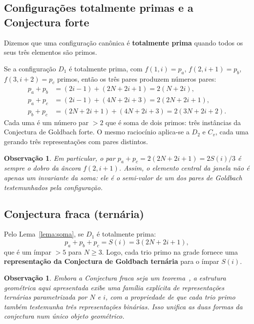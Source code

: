 \documentclass[12pt, a4paper]{article}
\newtheorem{observacao}[lema]{Observação}
\begin{document}
	\subsection{Configurações totalmente primas e a Conjectura forte}
	
	Dizemos que uma configuração canônica é \textbf{totalmente prima} quando todos os
	seus três elementos são primos.
	
	Se a configuração $D_1$ é totalmente prima, com
	$f(1,i)=p_a$, $f(2,i+1)=p_b$, $f(3,i+2)=p_c$ primos, então os três pares produzem
	números pares:
	\begin{align*}
		p_a + p_b &= (2i-1)+(2N+2i+1) = 2(N+2i),\\
		p_a + p_c &= (2i-1)+(4N+2i+3) = 2(2N+2i+1),\\
		p_b + p_c &= (2N+2i+1)+(4N+2i+3) = 2(3N+2i+2).
	\end{align*}
	Cada uma é um número par $>2$ que é soma de dois primos: três instâncias da
	Conjectura de Goldbach forte. O mesmo raciocínio aplica-se a $D_2$ e $C_v$,
	cada uma gerando três representações com pares distintos.
	
	\begin{observacao}
		Em particular, o par $p_a+p_c=2(2N+2i+1)=2S(i)/3$ é sempre o dobro da âncora
		$f(2,i+1)$. Assim, o elemento central da janela não é apenas um invariante da soma:
		ele é o semi-valor de um dos pares de Goldbach testemunhados pela configuração.
	\end{observacao}
	
	\subsection{Conjectura fraca (ternária)}
	
	Pelo Lema~\ref{lema:soma}, se $D_1$ é totalmente prima:
	\[
	p_a + p_b + p_c = S(i) = 3(2N+2i+1),
	\]
	que é um ímpar $>5$ para $N\ge 3$. Logo, cada trio primo na grade fornece uma
	\textbf{representação da Conjectura de Goldbach ternária} para o ímpar $S(i)$.
	
	\begin{observacao}
		Embora a Conjectura fraca seja um teorema~\cite{helfgott2013}, a estrutura
		geométrica aqui apresentada exibe uma família explícita de representações ternárias
		parametrizada por $N$ e $i$, com a propriedade de que cada trio primo também
		testemunha três representações binárias. Isso unifica as duas formas da conjectura
		num único objeto geométrico.
	\end{observacao}
	
\end{document}
